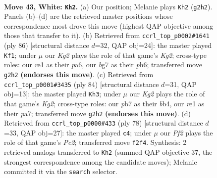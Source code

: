 \documentclass[11pt]{article}
\begin{document}
\clearpage

\begin{figure}[p]\centering
\begin{subfigure}{0.46\textwidth}\centering
\resizebox{\linewidth}{!}{%
\newchessgame
\chessboard[
  setfen={2N3k1/1p4b1/6p1/5p1p/Pr6/R5PP/5PK1/4r3 w - - 1 43},
  showmover=false,
  pgfstyle=straightmove, color=movearrow, markmove={g2-h2}
]}
\caption{}
\end{subfigure}\hfill
\begin{subfigure}{0.46\textwidth}\centering
\resizebox{\linewidth}{!}{%
\newchessgame
\chessboard[
  setfen={8/7k/p1p4p/6p1/3rp1P1/1P2R2P/1P3PK1/8 w - - 0 44},
  showmover=false,
  pgfstyle=straightmove, color=movearrow, markmove={g2-f1}
]}
\caption{}
\end{subfigure}
\\[4pt]
\begin{subfigure}{0.46\textwidth}\centering
\resizebox{\linewidth}{!}{%
\newchessgame
\chessboard[
  setfen={8/p4N2/6p1/5k1p/rb5P/6P1/P1R2PK1/8 w - - 10 43},
  showmover=false,
  pgfstyle=straightmove, color=movearrow, markmove={g2-h3}
]}
\caption{}
\end{subfigure}\hfill
\begin{subfigure}{0.46\textwidth}\centering
\resizebox{\linewidth}{!}{%
\newchessgame
\chessboard[
  setfen={8/3k4/p2p2r1/1pp3PR/8/PP6/1KP5/8 w - - 0 40},
  showmover=false,
  pgfstyle=straightmove, color=movearrow, markmove={c2-c4}
]}
\caption{}
\end{subfigure}
\caption{\textbf{Move 43, White: \texttt{Kh2}.} (a) Our position; Melanie plays \texttt{Kh2} (\texttt{g2h2}). Panels (b)--(d) are the retrieved master positions whose correspondence most drove this move (highest QAP objective among those that transfer to it). (b) Retrieved from \texttt{ccrl\_top\_p0002\#1641} (ply 86) [structural distance $d$=32, QAP obj=24]: the master played \texttt{Kf1}; under $\mu$ our \emph{Kg2} plays the role of that game's \emph{Kg2}; cross-type roles: our \emph{r}e1 as their \emph{p}a6, our \emph{b}g7 as their \emph{p}h6; transferred move \texttt{g2h2} \textbf{(endorses this move)}. (c) Retrieved from \texttt{ccrl\_top\_p0001\#3435} (ply 84) [structural distance $d$=31, QAP obj=13]: the master played \texttt{Kh3}; under $\mu$ our \emph{Kg2} plays the role of that game's \emph{Kg2}; cross-type roles: our \emph{p}b7 as their \emph{b}b4, our \emph{r}e1 as their \emph{p}a7; transferred move \texttt{g2h2} \textbf{(endorses this move)}. (d) Retrieved from \texttt{ccrl\_top\_p0000\#433} (ply 78) [structural distance $d$=33, QAP obj=27]: the master played \texttt{c4}; under $\mu$ our \emph{Pf2} plays the role of that game's \emph{Pc2}; transferred move \texttt{f2f4}. Synthesis: 2 retrieved analogs transferred to \texttt{Kh2} (summed QAP objective 37, the strongest correspondence among the candidate moves); Melanie committed it via the \texttt{search} selector.}
\label{fig:thought-m84}
\end{figure}
\end{document}

